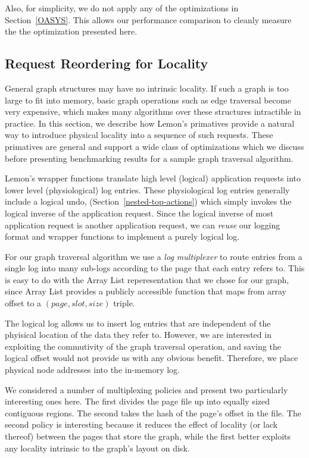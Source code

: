 \documentclass[letterpaper,twocolumn,english]{article}
\newcommand{\yad}{Lemon\xspace}
\begin{document}
Also, for simplicity, we do not apply any of the optimizations in
Section~\ref{OASYS}.  This allows our performance comparison to
cleanly measure the the optimization presented here.

\subsection {Request Reordering for Locality}

General graph structures may have no intrinsic locality.  If such a
graph is too large to fit into memory, basic graph operations such as
edge traversal become very expensive, which makes many algorithms over
these structures intractible in practice.  In this section, we
describe how \yad's primatives provide a natural way to introduce
physical locality into a sequence of such requests.  These primatives
are general and support a wide class of optimizations which we discuss
before presenting benchmarking results for a sample graph traversal
algorithm.

\yad's wrapper functions translate high level (logical) application
requests into lower level (physiological) log entries.  These
physiological log entries generally include a logical undo,
(Section~\ref{nested-top-actions}) which simply invokes the logical
inverse of the application request.  Since the logical inverse of most
application request is another application request, we can {\em reuse} our
logging format and wrapper functions to implement a purely logical log.

For our graph traversal algorithm we use a {\em log multiplexer} to
route entries from a single log into many sub-logs according to the
page that each entry refers to.  This is easy to do with the Array
List reperesentation that we chose for our graph, since Array List
provides a publicly accessible function that maps from array offset to
a $(page, slot, size)$ triple.

The logical log allows us to insert log entries that are independent
of the phyisical location of the data they refer to.  However, we are
interested in exploiting the commutivity of the graph traversal
operation, and saving the logical offset would not provide us with any
obvious benefit.  Therefore, we place physical node addresses into the
in-memory log.

We considered a number of multiplexing policies and present two
particularly interesting ones here.  The first divides the page file
up into equally sized contiguous regions.  The second takes the hash
of the page's offset in the file.  The second policy is interesting
because it reduces the effect of locality (or lack thereof) between
the pages that store the graph, while the first better exploits any
locality intrinsic to the graph's layout on disk.
\end{document}
